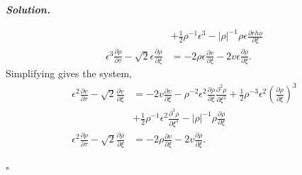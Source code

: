 \documentclass[12pt]{report}
\newenvironment{solution}[1][\it{Solution}]{\textbf{#1. } }{$\square$}
\def\eps{{\epsilon}}
\newcommand{\paren}[1]{{\left(#1\right)}} %
\newcommand{\abs}[1]{{\left|#1\right|}} %
\newcommand{\pp}[2]{\frac{\partial #1}{\partial #2}} %
\newcommand{\ppn}[3]{\frac{\partial^{#1} #2}{\partial #3^{#1}}} %
\begin{document}
\begin{solution}
\begin{enumerate}
\begin{align*}
            &+ \frac{1}{2}\rho^{-1}\eps^3 - \abs{\rho}^{-1}\rho\eps\pp{rho}{\xi}\\
            \eps^3\pp{\rho}{\tau} - \sqrt{2} \eps \pp{\rho}{\xi} &= -2\rho \eps \pp{v}{\xi} - 2v\eps \pp{\rho}{\xi}.
        \end{align*}
        Simplifying gives the system,
        \begin{align*}
            \eps^2\pp{v}{\tau} - \sqrt{2} \pp{v}{\xi} &= -2v\pp{v}{\xi} - \rho^{-2}\eps^2\pp{\rho}{\xi}\ppn{2}{\rho}{\xi} + \frac{1}{2}\rho^{-3}\eps^2 \paren{\pp{\rho}{\xi}}^3\\
            &+ \frac{1}{2}\rho^{-1}\eps^2\ppn{3}{\rho}{\xi} - \abs{\rho}^{-1}\rho \pp{\rho}{\xi}\\
            \eps^2 \pp{\rho}{\tau} - \sqrt{2} \pp{\rho}{\xi} &= -2\rho \pp{v}{\xi} - 2v \pp{\rho}{\xi}.
        \end{align*}


\end{enumerate}
\end{solution}
\end{document}
